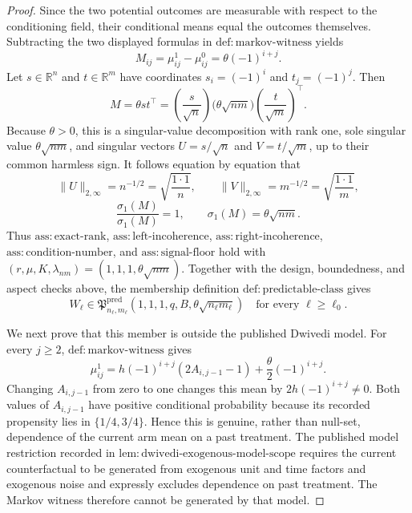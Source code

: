 \documentclass{article}
\begin{document}
\begin{proof}
Since the two potential outcomes are measurable with respect to the conditioning field, their conditional means equal the outcomes themselves.  Subtracting the two displayed formulas in \(\mathrm{def:markov\mbox{-}witness}\) yields
\[
 M_{ij}=\mu^1_{ij}-\mu^0_{ij}=\theta(-1)^{i+j}.
\]
Let \(s\in\mathbb R^n\) and \(t\in\mathbb R^m\) have coordinates \(s_i=(-1)^i\) and \(t_j=(-1)^j\).  Then
\[
 M=\theta st^\top
   =\left(\frac{s}{\sqrt n}\right)
      \bigl(\theta\sqrt{nm}\bigr)
      \left(\frac{t}{\sqrt m}\right)^\top .
\]
Because \(\theta>0\), this is a singular-value decomposition with rank one, sole singular value \(\theta\sqrt{nm}\), and singular vectors \(U=s/\sqrt n\) and \(V=t/\sqrt m\), up to their common harmless sign.  It follows equation by equation that
\[
 \lVert U\rVert_{2,\infty}=n^{-1/2}=\sqrt{\frac{1\cdot1}{n}},
 \qquad
 \lVert V\rVert_{2,\infty}=m^{-1/2}=\sqrt{\frac{1\cdot1}{m}},
\]
\[
 \frac{\sigma_1(M)}{\sigma_1(M)}=1,
 \qquad
 \sigma_1(M)=\theta\sqrt{nm}.
\]
Thus \(\mathrm{ass:exact\mbox{-}rank}\), \(\mathrm{ass:left\mbox{-}incoherence}\), \(\mathrm{ass:right\mbox{-}incoherence}\), \(\mathrm{ass:condition\mbox{-}number}\), and \(\mathrm{ass:signal\mbox{-}floor}\) hold with \((r,\mu,K,\lambda_{nm})=(1,1,1,\theta\sqrt{nm})\).  Together with the design, boundedness, and aspect checks above, the membership definition \(\mathrm{def:predictable\mbox{-}class}\) gives
\[
 W_\ell\in
 \mathfrak P^{\mathrm{pred}}_{n_\ell,m_\ell}
 \left(1,1,1,q,B,\theta\sqrt{n_\ell m_\ell}\right)
 \quad\text{for every }\ell\ge\ell_0.
\]

We next prove that this member is outside the published Dwivedi model.  For every \(j\ge2\), \(\mathrm{def:markov\mbox{-}witness}\) gives
\[
 \mu^1_{ij}
 =h(-1)^{i+j}(2A_{i,j-1}-1)+\frac{\theta}{2}(-1)^{i+j}.
\]
Changing \(A_{i,j-1}\) from zero to one changes this mean by \(2h(-1)^{i+j}\ne0\).  Both values of \(A_{i,j-1}\) have positive conditional probability because its recorded propensity lies in \(\{1/4,3/4\}\).  Hence this is genuine, rather than null-set, dependence of the current arm mean on a past treatment.  The published model restriction recorded in \(\mathrm{lem:dwivedi\mbox{-}exogenous\mbox{-}model\mbox{-}scope}\) requires the current counterfactual to be generated from exogenous unit and time factors and exogenous noise and expressly excludes dependence on past treatment.  The Markov witness therefore cannot be generated by that model.


\end{proof}
\end{document}
